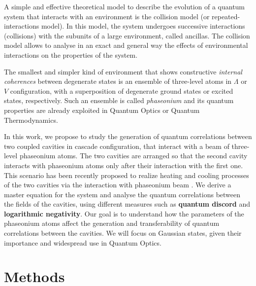 \documentclass[entropy,article,submit,pdftex,moreauthors]{Definitions/mdpi}
\begin{document}
A simple and effective theoretical model to describe the evolution of a quantum system that interacts with an environment is the collision model (or repeated-interactions model). 
In this model, the system undergoes successive interactions (collisions) with the subunits of a large environment, called ancillas. 
The collision model allows to analyse in an exact and general way the effects of environmental interactions on the properties of the system.

The smallest and simpler kind of environment that shows constructive \emph{internal coherences} between degenerate states is an ensemble of three-level atoms in $\Lambda$ or $V$ configuration, with a superposition of degenerate ground states or excited states, respectively.
Such an ensemble is called \emph{phaseonium} and its quantum properties are already exploited in Quantum Optics or Quantum Thermodynamics.

In this work, we propose to study the generation of quantum correlations between two coupled cavities in cascade configuration, that interact with a beam of three-level phaseonium atoms. 
The two cavities are arranged so that the second cavity interacts with phaseonium atoms only after their interaction with the first one. 
This scenario has been recently proposed to realize heating and cooling processes of the two cavities via the interaction with phaseonium beam \cite{phaseonium-driven-dynamics}.
We derive a master equation for the system and analyse the quantum correlations between the fields of the cavities, using different measures such as \textbf{quantum discord} and \textbf{logarithmic negativity}. 
Our goal is to understand how the parameters of the phaseonium atoms affect the generation and transferability of quantum correlations between the cavities.
We will focus on Gaussian states, given their importance and widespread use in Quantum Optics.



\section{Methods}
\end{document}
